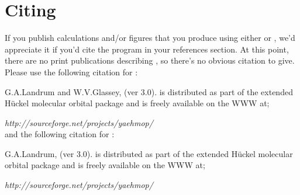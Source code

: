 \chapter{Citing \prog}

If you publish calculations and/or figures that you produce using either
\calcprog or \viewprog, we'd appreciate it if you'd cite the program 
in your references section.  
At this point, there are no print publications describing
\prog, so there's no obvious citation to give. \\[0.2in]

\noindent Please use the following citation for \calcprog:

\noindent G.A.Landrum and W.V.Glassey, \calcprog (ver 3.0).
\calcprog is distributed as part of the \prog extended H\"{u}ckel molecular orbital package and is freely available on the WWW at;

{\it http://sourceforge.net/projects/yaehmop/} \\[0.2in]

\noindent and the following citation for \viewprog:

\noindent G.A.Landrum, \viewprog (ver 3.0).
\viewprog is distributed as part of the \prog extended H\"{u}ckel molecular orbital package and is freely available on the WWW at;

{\it http://sourceforge.net/projects/yaehmop/} 

